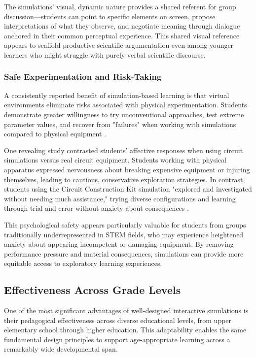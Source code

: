 The simulations' visual, dynamic nature provides a shared referent for group discussion—students can point to specific elements on screen, propose interpretations of what they observe, and negotiate meaning through dialogue anchored in their common perceptual experience. This shared visual reference appears to scaffold productive scientific argumentation even among younger learners who might struggle with purely verbal scientific discourse.

\subsubsection{Safe Experimentation and Risk-Taking}

A consistently reported benefit of simulation-based learning is that virtual environments eliminate risks associated with physical experimentation. Students demonstrate greater willingness to try unconventional approaches, test extreme parameter values, and recover from "failures" when working with simulations compared to physical equipment \cite{phet2023}.

One revealing study contrasted students' affective responses when using circuit simulations versus real circuit equipment. Students working with physical apparatus expressed nervousness about breaking expensive equipment or injuring themselves, leading to cautious, conservative exploration strategies. In contrast, students using the Circuit Construction Kit simulation "explored and investigated without needing much assistance," trying diverse configurations and learning through trial and error without anxiety about consequences \cite{finkelstein2005phet}.

This psychological safety appears particularly valuable for students from groups traditionally underrepresented in STEM fields, who may experience heightened anxiety about appearing incompetent or damaging equipment. By removing performance pressure and material consequences, simulations can provide more equitable access to exploratory learning experiences.

\subsection{Effectiveness Across Grade Levels}

One of the most significant advantages of well-designed interactive simulations is their pedagogical effectiveness across diverse educational levels, from upper elementary school through higher education. This adaptability enables the same fundamental design principles to support age-appropriate learning across a remarkably wide developmental span.

